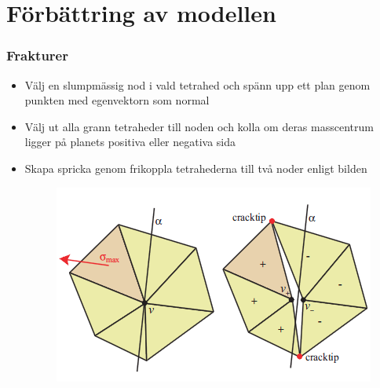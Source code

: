 \documentclass{beamer}
\begin{document}
\section{Förbättring av modellen}
\begin{frame}
\frametitle{Frakturer}
\begin{itemize}
\item Välj en slumpmässig nod i vald tetrahed och spänn upp ett plan genom punkten med egenvektorn som normal

\item Välj ut alla grann tetraheder till noden och kolla om deras masscentrum ligger på planets positiva eller negativa sida

\item Skapa spricka genom frikoppla tetrahederna till två noder enligt bilden

\begin{figure}
\includegraphics[scale=0.5]{fracture.png}
\end{figure}

\end{itemize}
\end{frame}
\end{document}
